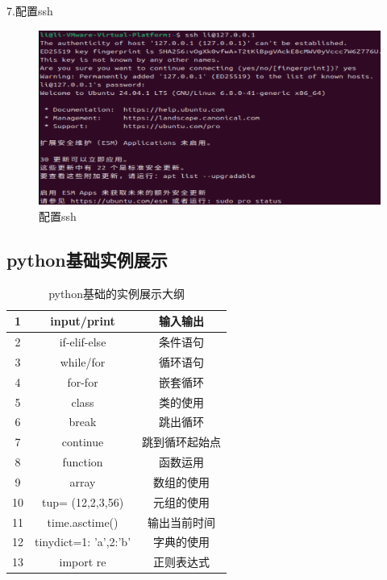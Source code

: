 \documentclass[a4paper, 12pt]{article}
\begin{document}
7.配置ssh
\begin{figure}[H]
  \centering
  \includegraphics[width=\textwidth]{屏幕截图 2024-09-12 214404.png}
  \caption{配置ssh}
\end{figure}


\subsection{python基础实例展示}

\begin{table}[H]
\centering
\caption{\color{red}python基础的实例展示大纲}
\begin{tabular}{ccc} 
\toprule

 1&   input/print        &  输入输出                     \\ 
\hline
 2&if-elif-else   & 条件语句  \\ 
\hline
 3& while/for &  循环语句\\ 
\hline
 4& for-for & 嵌套循环  \\ 
\hline
 5&class & 类的使用  \\ 
\hline
 6& break&  跳出循环\\
 \hline

 7& continue &  跳到循环起始点\\
 \hline
8 &function &   函数运用 \\
 \hline
9 &array &   数组的使用\\
 \hline
 10 & tup= (12,2,3,56) &   元组的使用\\
 11 & time.asctime() &  输出当前时间\\
 12 & tinydict={1: 'a',2:'b'} &   字典的使用\\
 13 & import re &   正则表达式\\

\bottomrule
\end{tabular}
\end{table}
\end{document}
